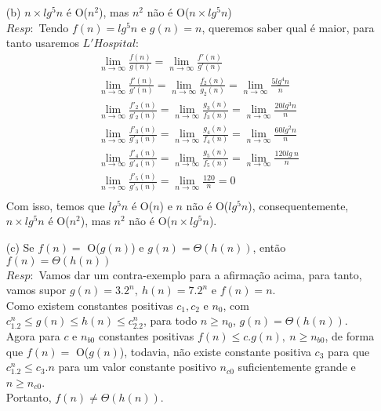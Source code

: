 \documentclass{homework}
\begin{document}
\pagestyle{fancy}

	\begin{enumerate}
		\item[(b)] $n \times lg^5n$ é O($n^2$), mas $n^2$ não é O($n \times lg^5n$)\\
			$Resp:$ Tendo $f(n)=lg^5n$ e $g(n) = n$, queremos saber qual é maior, para tanto usaremos $L'Hospital$: 
			\begin{align*}
				& \lim_{n \to \infty} \frac{f(n)}{g(n)} = \lim_{n \to \infty} \frac{f'(n)}{g'(n)}\\
				& \lim_{n \to \infty} \frac{f'(n)}{g'(n)} = \lim_{n \to \infty} \frac{f_2(n)}{g_2(n)} = \lim_{n \to \infty} \frac{5lg^4n}{n}\\
				& \lim_{n \to \infty} \frac{f'_2(n)}{g'_2(n)} = \lim_{n \to \infty} \frac{g_3(n)}{f_3(n)} = \lim_{n \to \infty} \frac{20lg^3n}{n}\\
				& \lim_{n \to \infty} \frac{f'_3(n)}{g'_3(n)} = \lim_{n \to \infty} \frac{g_4(n)}{f_4(n)} = \lim_{n \to \infty} \frac{60lg^2n}{n}\\
				& \lim_{n \to \infty} \frac{f'_4(n)}{g'_4(n)} = \lim_{n \to \infty} \frac{g_5(n)}{f_5(n)} = \lim_{n \to \infty} \frac{120lg\ n}{n}\\
				& \lim_{n \to \infty} \frac{f'_5(n)}{g'_5(n)} = \lim_{n \to \infty} \frac{120}{n} = 0\\
			\end{align*}
			Com isso, temos que $lg^5n$ é O($n$) e $n$ não é O($lg^5n$), consequentemente, $n \times lg^5n$ é O($n^2$), mas $n^2$ não é O($n \times lg^5n$).			
	\end{enumerate}		
		
	\begin{enumerate}
		\item[(c)] Se $f(n) =$ O($g(n)$) e $g(n) = \Theta(h(n))$, então $f(n) = \Theta(h(n))$\\
		$Resp:$ Vamos dar um contra-exemplo para a afirmação acima, para tanto, vamos supor $g(n) = 3.2^n,\ h(n) = 7.2^n$ e $f(n) = n$.\\
		Como existem constantes positivas $c_1,c_2$ e $n_0$, com $c_1.2^n \leq g(n) \leq h(n) \leq c_2.2^n$, para todo $n \geq n_0$, $g(n) = \Theta(h(n))$.\\
		Agora para $c$ e $n_{b0}$ constantes positivas $f(n) \leq c.g(n),\ n \geq n_{b0}$,  de forma que $f(n)=$ O($g(n)$), todavia, não existe constante positiva $c_3$ para que $c_1.2^n \leq c_3.n$ para um valor constante positivo $n_{c0}$ suficientemente grande e $n \geq n_{c0}$.\\
		Portanto, $f(n) \neq \Theta(h(n))$.
	\end{enumerate}
\end{document}
